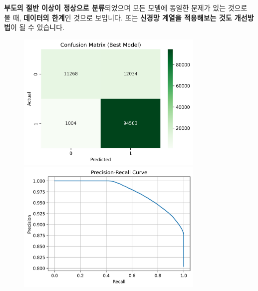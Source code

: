 \documentclass[
  a4paper,
  DIV=11,
  numbers=noendperiod]{scrreprt}
\begin{document}
\textbf{부도의 절반 이상이 정상으로 분류}되었으며 모든 모델에 동일한
문제가 있는 것으로 볼 때, \textbf{데이터의 한계}인 것으로 보입니다. 또는
\textbf{신경망 계열을 적용해보는 것도 개선방법}이 될 수 있습니다.

\begin{figure}

\begin{minipage}{0.50\linewidth}

\includegraphics[width=0.8\textwidth,height=\textheight]{plots/confusion_matrix.png}

\end{minipage}%
%
\begin{minipage}{0.50\linewidth}

\includegraphics[width=0.8\textwidth,height=\textheight]{plots/precision_recall_curve.png}

\end{minipage}%

\end{figure}%
\end{document}
